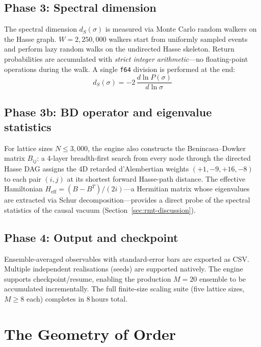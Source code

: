 \documentclass[aps,prd,twocolumn,superscriptaddress,nofootinbib,amsmath,amssymb,longbibliography]{revtex4-2}
\newcommand{\ds}{d_S}
\begin{document}
\subsection{Phase 3: Spectral dimension}

The spectral dimension $\ds(\sigma)$ is measured via Monte Carlo random
walkers on the Hasse graph.
$W = 2{,}250{,}000$ walkers start from
uniformly sampled events and perform lazy random walks on the undirected
Hasse skeleton.
Return probabilities are accumulated with \emph{strict integer
arithmetic}---no floating-point operations during the walk.
A single \texttt{f64} division is performed at the end:
\begin{equation}\label{eq:ds}
  \ds(\sigma) = -2\,\frac{d\ln P(\sigma)}{d\ln\sigma}
\end{equation}

\subsection{Phase 3b: BD operator and eigenvalue statistics}

For lattice sizes $N \leq 3{,}000$, the engine also constructs the
Benincasa--Dowker matrix $B_{ij}$: a 4-layer breadth-first search
from every node through the directed Hasse DAG assigns the 4D
retarded d'Alembertian weights $(+1, -9, +16, -8)$ to each pair
$(i,j)$ at its shortest forward Hasse-path distance.  The effective
Hamiltonian $H_{\mathrm{eff}} = (B - B^{T})/(2i)$---a Hermitian
matrix whose eigenvalues are extracted via Schur
decomposition---provides a direct probe of the spectral statistics
of the causal vacuum (Section~\ref{sec:rmt-discussion}).

\subsection{Phase 4: Output and checkpoint}

Ensemble-averaged observables with standard-error bars are exported as
CSV.  Multiple independent realisations (seeds) are supported natively.
The engine supports checkpoint/resume, enabling
the production $M = 20$ ensemble to be accumulated incrementally.
The full finite-size scaling suite (five lattice sizes,
$M \geq 8$ each) completes in 8\,hours total.

\section{The Geometry of Order}\label{sec:order}
\end{document}
